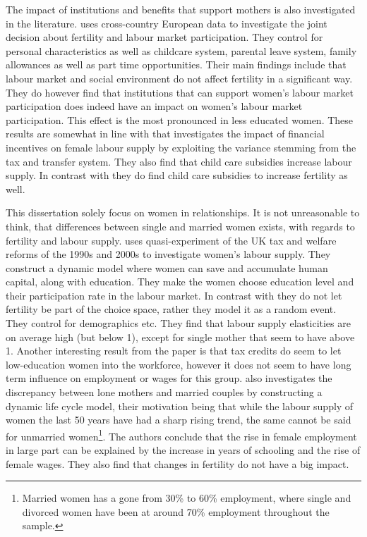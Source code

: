 The impact of institutions and benefits that support mothers is also investigated in the literature.\textcite{del_boca_motherhood_2009}  uses cross-country European data to investigate the joint decision about fertility and labour market participation. They control for personal characteristics as well as childcare system, parental leave system, family allowances as well as part time opportunities. Their main findings include that labour market and social environment do not affect fertility in a significant way. They do however find that institutions that can support women's labour market participation does indeed have an impact on women's labour market participation. This effect is the most pronounced in less educated women. These results are somewhat in line with \textcite{haan_can_2009} that investigates the impact of financial incentives on female labour supply by exploiting the variance stemming from the tax and transfer system. They also find that child care subsidies increase labour supply. In contrast with \textcite{del_boca_motherhood_2009} they do find child care subsidies to increase fertility as well.

This dissertation solely focus on women in relationships. It is not unreasonable to think, that differences between single and married women exists, with regards to fertility and labour supply. \textcite{blundell_female_2016} uses quasi-experiment of the UK tax and welfare reforms of the 1990s and 2000s to investigate women's labour supply. They construct a dynamic model where women can save and accumulate human capital, along with education. They make the women choose education level and their participation rate in the labour market. In contrast with \textcite{francesconi_joint_2002} they do not let fertility be part of the choice space, rather they model it as a random event. They control for demographics etc. They find that labour supply elasticities are on average high (but below 1), except for single mother that seem to have above 1. Another interesting result from the paper is that tax credits do seem to let low-education women into the workforce, however it does not seem to have long term influence on employment or wages for this group. \textcite{eckstein_dynamic_2011} also investigates the discrepancy between lone mothers and married couples by constructing a dynamic life cycle model, their motivation being that while the labour supply of women the last 50 years have had a sharp rising trend, the same cannot be said for unmarried women\footnote{Married women has a gone from 30\% to 60\% employment, where single and divorced women have been at around 70\% employment throughout the sample.}. The authors conclude that the rise in female employment in large part can be explained by the increase in years of schooling and the rise of female wages. They also find that changes in fertility do not have a big impact. 

